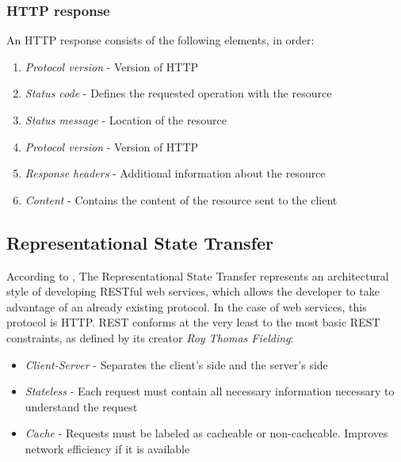 \subsubsection{HTTP response}
An HTTP response consists of the following elements, in order:
\begin{enumerate}
    \item \textit{Protocol version} - Version of HTTP
    \item \textit{Status code} - Defines the requested operation with the resource
    \item \textit{Status message} - Location of the resource
    \item \textit{Protocol version} - Version of HTTP
    \item \textit{Response headers} - Additional information about the resource
    \item \textit{Content} - Contains the content of the resource sent to the client
    \end{enumerate}
\subsection{Representational State Transfer}
According to \cite{RestAPI}, The Representational State Transfer represents an architectural style of developing RESTful web services, which allows the developer to take advantage of an already existing protocol. In the case of web services, this protocol is HTTP. REST conforms at the very least to the most basic REST constraints, as defined by its creator \textit{Roy Thomas Fielding}:

\begin{itemize}
    \item \textit{Client-Server} - Separates the client's side and the server's side
    \item \textit{Stateless} - Each request must contain all necessary information necessary to understand the request
    \item \textit{Cache} - Requests must be labeled as cacheable or non-cacheable. Improves network efficiency if it is available
\end{itemize}
